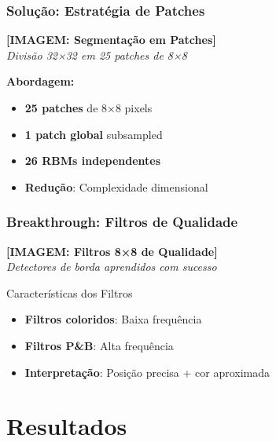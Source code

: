 \documentclass[aspectratio=169]{beamer}
\begin{document}
\begin{frame}
\frametitle{Solução: Estratégia de Patches}
\begin{center}
\textbf{[IMAGEM: Segmentação em Patches]}\\
\textit{Divisão 32×32 em 25 patches de 8×8}
\end{center}

\textbf{Abordagem:}
\begin{itemize}
    \item \textcolor{azulescuro}{\textbf{25 patches}} de 8×8 pixels
    \item \textcolor{azulescuro}{\textbf{1 patch global}} subsampled
    \item \textcolor{azulescuro}{\textbf{26 RBMs independentes}}
    \item \textcolor{azulescuro}{\textbf{Redução}}: Complexidade dimensional
\end{itemize}
\end{frame}

\begin{frame}
\frametitle{Breakthrough: Filtros de Qualidade}
\begin{center}
\textbf{[IMAGEM: Filtros 8×8 de Qualidade]}\\
\textit{Detectores de borda aprendidos com sucesso}
\end{center}

\begin{exampleblock}{Características dos Filtros}
\begin{itemize}
    \item \textcolor{azulescuro}{\textbf{Filtros coloridos}}: Baixa frequência
    \item \textcolor{azulescuro}{\textbf{Filtros P\&B}}: Alta frequência
    \item \textcolor{azulescuro}{\textbf{Interpretação}}: Posição precisa + cor aproximada
\end{itemize}
\end{exampleblock}
\end{frame}

\section{Resultados}
\end{document}
